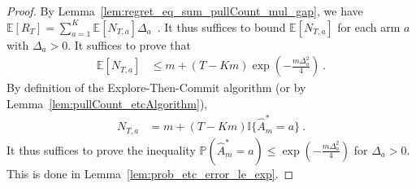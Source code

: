 \begin{proof}
By Lemma~\ref{lem:regret_eq_sum_pullCount_mul_gap}, we have $\mathbb{E}[R_T] = \sum_{a=1}^K \mathbb{E}\left[N_{T,a}\right] \Delta_a$~.
It thus suffices to bound $\mathbb{E}[N_{T,a}]$ for each arm $a$ with $\Delta_a > 0$.
It suffices to prove that
\begin{align*}
  \mathbb{E}[N_{T,a}]
  &\le m + (T - Km) \exp\left(- \frac{m \Delta_a^2}{4}\right)
  \: .
\end{align*}
By definition of the Explore-Then-Commit algorithm (or by Lemma~\ref{lem:pullCount_etcAlgorithm}),
\begin{align*}
  N_{T,a}
  &= m + (T - Km) \mathbb{I}\{\hat{A}_m^* = a\}
  \: .
\end{align*}
It thus suffices to prove the inequality $\mathbb{P}(\hat{A}_m^* = a) \le \exp\left(- \frac{m \Delta_a^2}{4}\right)$ for $\Delta_a > 0$.
This is done in Lemma~\ref{lem:prob_etc_error_le_exp}.
\end{proof}

